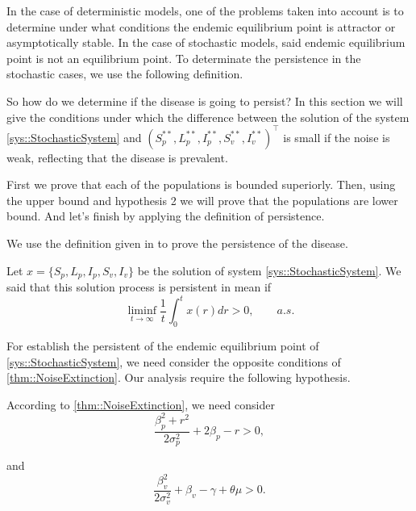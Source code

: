 
	In the case of deterministic models, one of the problems taken into
account is to determine under what conditions the endemic equilibrium point is 
attractor or asymptotically stable. In the case of stochastic models, said 
endemic equilibrium point is not an equilibrium point. To determinate the 
persistence in the stochastic cases, we use the following definition.

	So how do we determine if the disease is going to persist? In this section 
we will give the conditions under which the difference between the solution of 
the system \autoref{sys::StochasticSystem} and $ (S_p^{**}, L_p^{**}, I_p^{**}, S_v^{**}, I_v^{**})^\top$ is 
small if the noise is weak, reflecting that the disease is prevalent.

First we prove that each of the populations is bounded superiorly. Then, using the upper bound and
hypothesis 2 we will prove that the populations are lower bound. 
And let's finish by applying the definition of persistence.

We use the definition given in \cite{Zhao2015a} to prove the persistence of the disease.
\begin{definition}{\cite[][Def. *.*]{Zhao2015a}}
\label{def::persistence}
	Let $x = \{S_p,L_p,I_p,S_v,I_v\}$ be the solution of 
	system \autoref{sys::StochasticSystem}. 
	We said that this solution process is persistent in mean if	
	\begin{equation}
	    \liminf_{
	    	t \to
	    	\infty
	    }
	    \frac{1}{t}
	    \int_0^t x(r) dr >0,
	    \qquad a.s.
    \end{equation}
\end{definition}
For establish the persistent of the endemic equilibrium point of
\autoref{sys::StochasticSystem}, we need consider the opposite conditions
of \autoref{thm::NoiseExtinction}.
Our analysis require the following hypothesis.

\begin{hyp}\label{eqn::NoiseBreak}
	\item
	According to \autoref{thm::NoiseExtinction}, 
	we need consider  
	$$
		\frac{\beta_p^2+r^2}{2 \sigma_p^2} + 
		2\beta_p - r>0,
	$$ 
    \item
	and
	$$
		\frac{\beta_v^2}{2 \sigma_v^2}+\beta_v-\gamma +\theta\mu>0.
	$$
\end{hyp}

